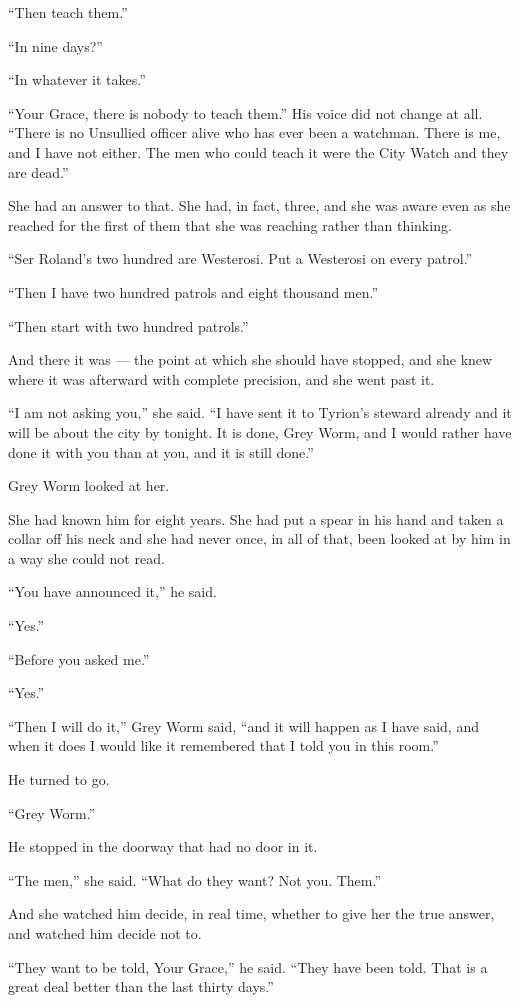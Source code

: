 “Then teach them.”

“In nine days?”

“In whatever it takes.”

“Your Grace, there is nobody to teach them.” His voice did not change at all. “There is no Unsullied officer alive who has ever been a watchman. There is me, and I have not either. The men who could teach it were the City Watch and they are dead.”

She had an answer to that. She had, in fact, three, and she was aware even as she reached for the first of them that she was reaching rather than thinking.

“Ser Roland’s two hundred are Westerosi. Put a Westerosi on every patrol.”

“Then I have two hundred patrols and eight thousand men.”

“Then start with two hundred patrols.”

And there it was — the point at which she should have stopped, and she knew where it was afterward with complete precision, and she went past it.

“I am not asking you,” she said. “I have sent it to Tyrion’s steward already and it will be about the city by tonight. It is done, Grey Worm, and I would rather have done it with you than at you, and it is still done.”

Grey Worm looked at her.

She had known him for eight years. She had put a spear in his hand and taken a collar off his neck and she had never once, in all of that, been looked at by him in a way she could not read.

“You have announced it,” he said.

“Yes.”

“Before you asked me.”

“Yes.”

“Then I will do it,” Grey Worm said, “and it will happen as I have said, and when it does I would like it remembered that I told you in this room.”

He turned to go.

“Grey Worm.”

He stopped in the doorway that had no door in it.

“The men,” she said. “What do they want? Not you. Them.”

And she watched him decide, in real time, whether to give her the true answer, and watched him decide not to.

“They want to be told, Your Grace,” he said. “They have been told. That is a great deal better than the last thirty days.”

